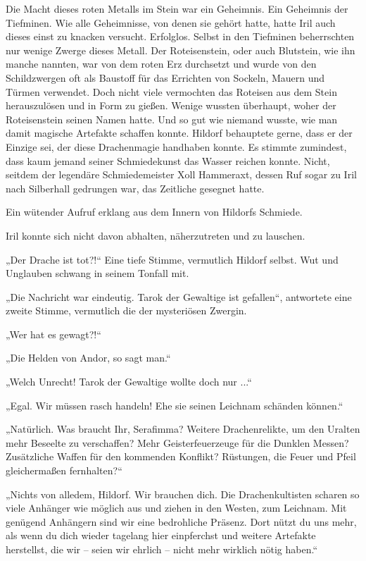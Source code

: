 Die Macht dieses roten Metalls im Stein war ein Geheimnis. Ein Geheimnis der Tiefminen. Wie alle Geheimnisse, von denen sie gehört hatte, hatte Iril auch dieses einst zu knacken versucht. Erfolglos. Selbst in den Tiefminen beherrschten nur wenige Zwerge dieses Metall. Der Roteisenstein, oder auch Blutstein, wie ihn manche nannten, war von dem roten Erz durchsetzt und wurde von den Schildzwergen oft als Baustoff für das Errichten von Sockeln, Mauern und Türmen verwendet. Doch nicht viele vermochten das Roteisen aus dem Stein herauszulösen und in Form zu gießen. Wenige wussten überhaupt, woher der Roteisenstein seinen Namen hatte. Und so gut wie niemand wusste, wie man damit magische Artefakte schaffen konnte. Hildorf behauptete gerne, dass er der Einzige sei, der diese Drachenmagie handhaben konnte. Es stimmte zumindest, dass kaum jemand seiner Schmiedekunst das Wasser reichen konnte. Nicht, seitdem der legendäre Schmiedemeister Xoll Hammeraxt, dessen Ruf sogar zu Iril nach Silberhall gedrungen war, das Zeitliche gesegnet hatte.

Ein wütender Aufruf erklang aus dem Innern von Hildorfs Schmiede.

Iril konnte sich nicht davon abhalten, näherzutreten und zu lauschen.

„Der Drache ist tot?!“ Eine tiefe Stimme, vermutlich Hildorf selbst. Wut und Unglauben schwang in seinem Tonfall mit.

„Die Nachricht war eindeutig. Tarok der Gewaltige ist gefallen“, antwortete eine zweite Stimme, vermutlich die der mysteriösen Zwergin.

„Wer hat es gewagt?!“

„Die Helden von Andor, so sagt man.“

„Welch Unrecht! Tarok der Gewaltige wollte doch nur ...“

„Egal. Wir müssen rasch handeln! Ehe sie seinen Leichnam schänden können.“

„Natürlich. Was braucht Ihr, Serafimma? Weitere Drachenrelikte, um den Uralten mehr Beseelte zu verschaffen? Mehr Geisterfeuerzeuge für die Dunklen Messen? Zusätzliche Waffen für den kommenden Konflikt? Rüstungen, die Feuer und Pfeil gleichermaßen fernhalten?“

„Nichts von alledem, Hildorf. Wir brauchen dich. Die Drachenkultisten scharen so viele Anhänger wie möglich aus und ziehen in den Westen, zum Leichnam. Mit genügend Anhängern sind wir eine bedrohliche Präsenz. Dort nützt du uns mehr, als wenn du dich wieder tagelang hier einpferchst und weitere Artefakte herstellst, die wir – seien wir ehrlich – nicht mehr wirklich nötig haben.“

